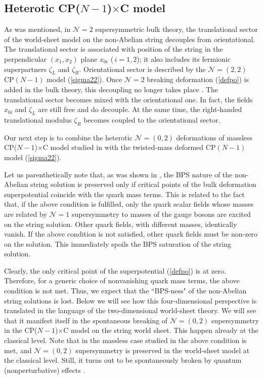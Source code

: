 \documentclass[12pt]{article}
\newcommand{\ntwo}{${\mathcal N}=2$ }
\newcommand{\ntwot}{${\mathcal N}= \left(2,2\right) $ }
\newcommand{\ntwoo}{${\mathcal N}= \left(0,2\right) $ }
\newcommand{\none}{${\mathcal N}=1$ }
\newcommand{\CPC}{CP($N-1$)$\times$C }
\begin{document}
 

\subsection{ Heterotic \boldmath{\ntwoo} \CPC  model}
\label{hbmnt}

As was mentioned, in   \ntwo supersymmetric bulk theory, the translational
sector of the world-sheet model on the non-Abelian string 
decouples from   orientational. The translational sector is
associated with position of the string in the 
perpendicular $(x_1,x_2)$
plane $x_{0i}$  ($\,i=1,2$); it also includes its fermionic superpartners
$\zeta_L$ and $\zeta_R$. Orientational sector is described by the \ntwot CP$(N-1)$ model (\ref{sigma22}). Once \ntwo
breaking deformation (\ref{defpo})
is added in the bulk theory, this decoupling no longer takes place \cite{Edalati}. The translational sector becomes
mixed with the orientational one. In fact, the  fields $x_{0i}$ and 
$\zeta_L$ are still free and do decouple. At the same time,  the 
right-handed translational modulus $\zeta_R$ becomes coupled to
the orientational sector. 

Our next step is to combine the heterotic \ntwoo deformations of massless
\CPC model studied in \cite{Edalati, SYhet,SYhetlN,BSYhet}
with the twisted-mass deformed CP$(N-1)$ model  (\ref{sigma22}).

Let us parenthetically note that, as was shown in \cite{Edalati,SYhet}, 
 the BPS nature of the non-Abelian   string solution is preserved only
if critical points of the bulk deformation superpotential coincide with the quark mass
terms. This is related to the fact that,
if the above condition is fulfilled,  only the  quark scalar fields whose masses are related by \none supersymmetry
to masses of the  gauge bosons are  excited on the string solution.
Other quark fields, with different masses, identically vanish. If the
above condition is not satisfied, other quark fields must be  
non-zero on the solution. This immediately spoils the BPS saturation of the string solution.

Clearly, the only critical point  of the superpotential (\ref{defpo})
is at zero. Therefore, for a generic   choice of nonvanishing
quark mass terms, the above condition is not met. 
Thus, we expect
that the ``BPS-ness" of the non-Abelian string solutions is lost. Below  
  we will see how this four-dimensional
  perspective is translated in the language of the two-dimensional
 world-sheet theory. We will
see that it manifest itself in the spontaneous breaking of 
\ntwoo supersymmetry in the \CPC model on the string world sheet. 
This happen already at the classical level. Note that in the massless case studied in \cite{SYhet,BSYhet} the above 
condition is met, and \ntwoo supersymmetry is preserved
in the world-sheet model at the classical level. Still, it turns
out to be spontaneously broken by quantum (nonperturbative)
effects 
\cite{Tongd,SYhet,SYhetlN}.
\end{document}
